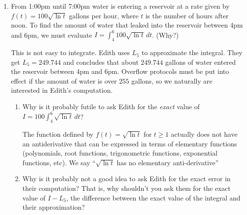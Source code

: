 \documentclass[main]{subfiles}
\begin{document}
\begin{enumerate}
\begin{enumerate}
   \begin{solution}
   If you're using a fixed number of slices, then as the width of the interval $(b-a)$ grows, your slices will become wider and wider.  As we know, the wider a slice is, the more potential there is for the function to change over that slice.  So we expect the error to grow as the length of the interval $(b-a)$ grows.
   \end{solution}
\end{enumerate}
\pspace{\newpage}
\item  \label{overflow-protocols}
\begin{problem}
From 1:00pm until 7:00pm water is entering a reservoir at a rate given by $f(t) = 100\sqrt{\ln t}$ gallons per 
hour, where $t$ is the number of hours after noon.  To find the amount of water that leaked into the reservoir 
between 4pm and 6pm, we must evaluate $I = \int_{4}^{6} 100 \sqrt{\ln t} \,dt$. (Why?)

This is not easy to integrate.  Edith uses $L_{5}$ to approximate the integral.  They get $L_{5}=249.744$ and concludes that about $249.744$ gallons of water entered the reservoir between 4pm and 6pm.  Overflow protocols must be put into effect if the amount of water is over $255$ gallons, so we naturally are interested in Edith's computation.
\end{problem}

\begin{enumerate}

  \item 
  \begin{problem}[.5in]
  Why is it probably futile to ask Edith for the \textit{exact} value of 
  $I = 100\int_{4}^{6} \sqrt{\ln t}\,dt$?
  \end{problem}

  \begin{solution}
  The function defined by $f(t) = \sqrt{\ln t}$ for $t \geq 1$ actually does not have an antiderivative
  that can be expressed in terms of elementary functions (polynomials, root functions, trigonometric functions,
  exponential functions, etc).  We say ``$\sqrt{\ln t}$ has no elementary anti-derivative''
  \end{solution}

  \item 
  \begin{problem}[.5in]
  Why is it probably not a good idea to ask Edith for the exact error in their computation?  That is, why 
  shouldn't you ask them for the exact value of $I-L_{5}$, the difference between the exact value of the integral
  and their approximation?
  \end{problem}


\end{enumerate}
\end{enumerate}
\end{document}
